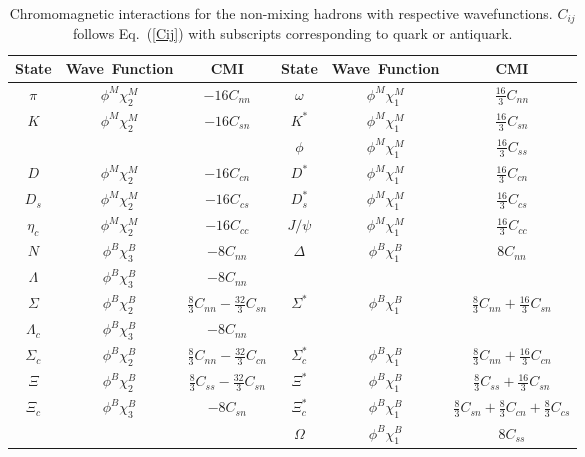 \documentclass[prd,twocolumn,floatfix,nofootinbib]{revtex4}
\begin{document}
\renewcommand{\tabcolsep}{0.14cm} \renewcommand{\arraystretch}{1.5}
\begin{table}[!htb]
\caption{Chromomagnetic interactions for the non-mixing hadrons with
respective wavefunctions. $C_{ij}$ follows Eq.~(\protect\ref{Cij}) with
subscripts corresponding to quark or antiquark.}
\label{tab:CMI}%
\begin{tabular}{cccccc}
\hline\hline
\textrm{State} & \textrm{Wave\ Function} & \textrm{CMI} & \textrm{State} &
\textrm{Wave\ Function} & \textrm{CMI} \\ \hline
$\pi$ & $\phi^{M}\chi_{2}^{M}$ & $-16C_{nn}$ & $\omega$ & $%
\phi^{M}\chi_{1}^{M}$ & $\frac{16}{3}C_{nn}$ \\
$K$ & $\phi^{M}\chi_{2}^{M}$ & $-16C_{sn}$ & $K^{\ast}$ & $%
\phi^{M}\chi_{1}^{M}$ & $\frac{16}{3}C_{sn}$ \\
&  &  & $\phi$ & $\phi^{M}\chi_{1}^{M}$ & $\frac{16}{3}C_{ss}$ \\
$D$ & $\phi^{M}\chi_{2}^{M}$ & $-16C_{cn}$ & $D^{\ast}$ & $%
\phi^{M}\chi_{1}^{M}$ & $\frac{16}{3}C_{cn}$ \\
$D_{s}$ & $\phi^{M}\chi_{2}^{M}$ & $-16C_{cs}$ & $D_{s}^{\ast}$ & $%
\phi^{M}\chi_{1}^{M}$ & $\frac{16}{3}C_{cs}$ \\
$\eta_{c}$ & $\phi^{M}\chi_{2}^{M}$ & $-16C_{cc}$ & $J/\psi$ & $%
\phi^{M}\chi_{1}^{M}$ & $\frac{16}{3}C_{cc}$ \\
$N$ & $\phi^{B}\chi_{3}^{B}$ & $-8C_{nn}$ & $\Delta$ & $\phi^{B}\chi_{1}^{B}$
& $8C_{nn}$ \\
$\Lambda$ & $\phi^{B}\chi_{3}^{B}$ & $-8C_{nn}$ &  &  &  \\
$\Sigma$ & $\phi^{B}\chi_{2}^{B}$ & $\frac{8}{3}C_{nn}-\frac{32}{3}C_{sn}$ &
$\Sigma^{\ast}$ & $\phi^{B}\chi_{1}^{B}$ & $\frac{8}{3}C_{nn}+\frac{16}{3}%
C_{sn}$ \\
$\Lambda_{c}$ & $\phi^{B}\chi_{3}^{B}$ & $-8C_{nn}$ &  &  &  \\
$\Sigma_{c}$ & $\phi^{B}\chi_{2}^{B}$ & $\frac{8}{3}C_{nn}-\frac{32}{3}%
C_{cn} $ & $\Sigma_{c}^{\ast}$ & $\phi^{B}\chi_{1}^{B}$ & $\frac{8}{3}C_{nn}+%
\frac{16}{3}C_{cn}$ \\
$\Xi$ & $\phi^{B}\chi_{2}^{B}$ & $\frac{8}{3}C_{ss}-\frac{32}{3}C_{sn}$ & $%
\Xi^{\ast}$ & $\phi^{B}\chi_{1}^{B}$ & $\frac{8}{3}C_{ss}+\frac{16}{3}C_{sn}$
\\
$\Xi_{c}$ & $\phi^{B}\chi_{3}^{B}$ & $-8C_{sn}$ & $\Xi_{c}^{\ast}$ & $%
\phi^{B}\chi_{1}^{B}$ & $\frac{8}{3}C_{sn}+\frac{8}{3}C_{cn}+\frac{8}{3}%
C_{cs}$ \\
&  &  & $\Omega$ & $\phi^{B}\chi_{1}^{B}$ & $8C_{ss}$ \\

\end{tabular}
\end{table}
\end{document}
